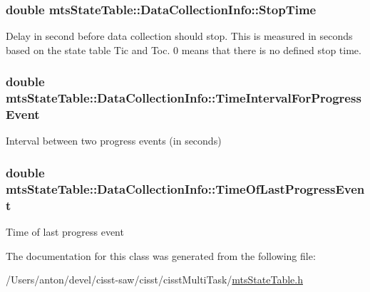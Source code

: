 \subsubsection[{Stop\+Time}]{\setlength{\rightskip}{0pt plus 5cm}double mts\+State\+Table\+::\+Data\+Collection\+Info\+::\+Stop\+Time}\label{classmts_state_table_1_1_data_collection_info_a9b815a904966196b006f88d2dc0e73b4}
Delay in second before data collection should stop. This is measured in seconds based on the state table Tic and Toc. 0 means that there is no defined stop time. \hypertarget{classmts_state_table_1_1_data_collection_info_aa82de94c4fe55892c5be18052e5e0c0b}{}
\subsubsection[{Time\+Interval\+For\+Progress\+Event}]{\setlength{\rightskip}{0pt plus 5cm}double mts\+State\+Table\+::\+Data\+Collection\+Info\+::\+Time\+Interval\+For\+Progress\+Event}\label{classmts_state_table_1_1_data_collection_info_aa82de94c4fe55892c5be18052e5e0c0b}
Interval between two progress events (in seconds) \hypertarget{classmts_state_table_1_1_data_collection_info_a160735e608b58846356e7fc6be792832}{}
\subsubsection[{Time\+Of\+Last\+Progress\+Event}]{\setlength{\rightskip}{0pt plus 5cm}double mts\+State\+Table\+::\+Data\+Collection\+Info\+::\+Time\+Of\+Last\+Progress\+Event}\label{classmts_state_table_1_1_data_collection_info_a160735e608b58846356e7fc6be792832}
Time of last progress event 

The documentation for this class was generated from the following file\+:\begin{DoxyCompactItemize}
\item 
/\+Users/anton/devel/cisst-\/saw/cisst/cisst\+Multi\+Task/\hyperlink{mts_state_table_8h}{mts\+State\+Table.\+h}\end{DoxyCompactItemize}
